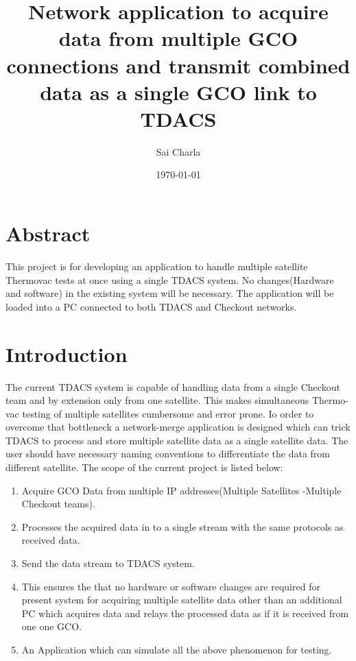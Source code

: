 \documentclass[12pt, a4paper]{report}
\title{Network application to acquire data from multiple GCO connections and
	   transmit combined data as a single GCO link to TDACS}
\author{Sai Charla}
\date{\today}
\begin{document}
\maketitle
\tableofcontents


\chapter*{Abstract}
\par This project is for developing an application to handle multiple satellite
Thermovac tests at once using a single TDACS system. No changes(Hardware and
software) in the existing system will be necessary. The application will be
loaded into a PC connected to both TDACS and Checkout networks.


\chapter{Introduction}

\par The current TDACS system is capable of handling data from a single
Checkout team and by extension only from one satellite. This makes simultaneous
Thermo-vac testing of multiple satellites cumbersome and error prone. Io order
to overcome that bottleneck a network-merge application is designed which can
trick TDACS to process and store multiple satellite data as a single satellite
data. The user should have necessary naming conventions to differentiate the
data from different satellite. The scope of the current project is listed below:

	\begin{enumerate}
			\item Acquire GCO Data from multiple IP addresses(Multiple Satellites
					-Multiple Checkout teams).
			\item Processes the acquired data in to a single stream with the same
					protocols as received data.
			\item Send the data stream to TDACS system.
			\item This ensures the that no hardware or software changes are required
					for present system for acquiring multiple satellite data other than an
					additional PC which acquires data and relays the processed data as if it
					is received from one one GCO.
			\item An Application which can simulate all the above phenomenon for
					testing.
	\end{enumerate}
\end{document}
